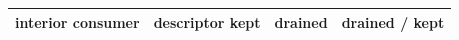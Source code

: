 \begin{tabular}{lrrr}
\toprule
interior consumer & descriptor kept & drained & drained / kept \\
\midrule
\bottomrule
\end{tabular}
